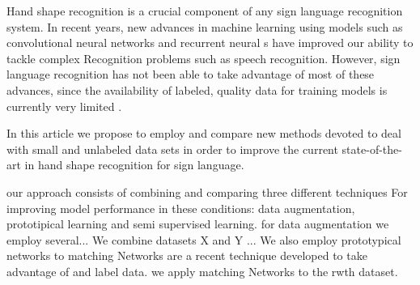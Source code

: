 

Hand shape recognition is a crucial component of any sign language recognition system. In recent years, new advances in machine learning   using models such as  convolutional neural networks  and recurrent neural s have improved our ability to tackle complex Recognition problems such as speech recognition. However, sign language recognition has not  been able to take advantage of most of these advances, since  the availability of labeled, quality data for training models is currently very limited \cite{}.   

In this article we propose to  employ and compare new methods devoted to deal with small and unlabeled data sets in order to improve the current state-of-the-art in hand shape recognition for sign language. 

our approach consists of combining and comparing three different techniques For improving model performance in these conditions: data augmentation,  prototipical learning and semi supervised learning.
for data augmentation we employ several... We combine datasets X and Y ...
We also employ prototypical networks to
matching Networks are a recent technique developed to take advantage of and label data.  we apply matching Networks to the rwth dataset.